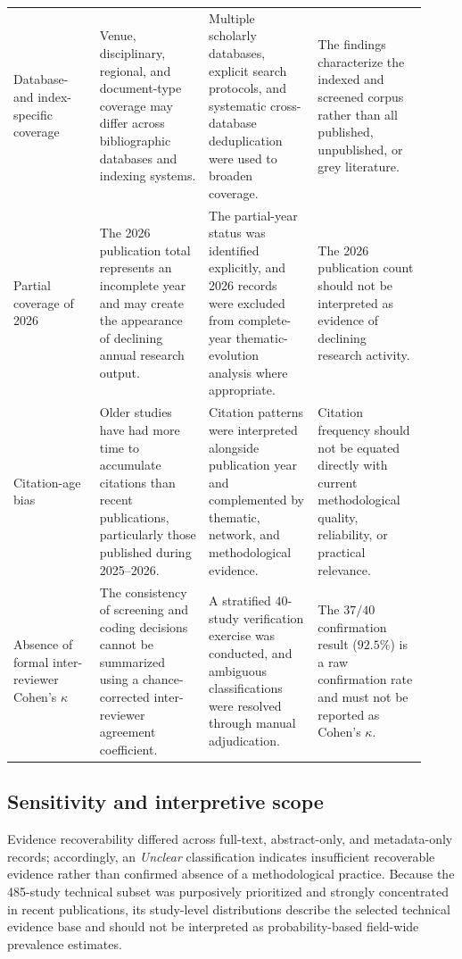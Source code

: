 \documentclass[12pt]{article}
\numberwithin{equation}{section}
\begin{document}
\begin{landscape}
\begin{longtable}{
@{}
L{0.19\linewidth}
L{0.245\linewidth}
L{0.245\linewidth}
L{0.245\linewidth}
@{}
}
Database- and index-specific coverage
&
Venue, disciplinary, regional, and document-type coverage may differ
across bibliographic databases and indexing systems.
&
Multiple scholarly databases, explicit search protocols, and systematic
cross-database deduplication were used to broaden coverage.
&
The findings characterize the indexed and screened corpus rather than
all published, unpublished, or grey literature.
\\
\addlinespace[3pt]

Partial coverage of 2026
&
The 2026 publication total represents an incomplete year and may create
the appearance of declining annual research output.
&
The partial-year status was identified explicitly, and 2026 records
were excluded from complete-year thematic-evolution analysis where
appropriate.
&
The 2026 publication count should not be interpreted as evidence of
declining research activity.
\\
\addlinespace[3pt]

Citation-age bias
&
Older studies have had more time to accumulate citations than recent
publications, particularly those published during 2025--2026.
&
Citation patterns were interpreted alongside publication year and
complemented by thematic, network, and methodological evidence.
&
Citation frequency should not be equated directly with current
methodological quality, reliability, or practical relevance.
\\
\addlinespace[3pt]

Absence of formal inter-reviewer Cohen's \(\kappa\)
&
The consistency of screening and coding decisions cannot be summarized
using a chance-corrected inter-reviewer agreement coefficient.
&
A stratified \(40\)-study verification exercise was conducted, and
ambiguous classifications were resolved through manual adjudication.
&
The \(37/40\) confirmation result (\(92.5\%\)) is a raw confirmation
rate and must not be reported as Cohen's \(\kappa\).
\\  

\bottomrule
\end{longtable}
\end{landscape}

\FloatBarrier

\subsection{Sensitivity and interpretive scope}

Evidence recoverability differed across full-text, abstract-only, and
metadata-only records; accordingly, an \textit{Unclear} classification
indicates insufficient recoverable evidence rather than confirmed absence
of a methodological practice. Because the 485-study technical subset was
purposively prioritized and strongly concentrated in recent publications,
its study-level distributions describe the selected technical evidence base
and should not be interpreted as probability-based field-wide prevalence
estimates.

\FloatBarrier
\clearpage



\end{document}
